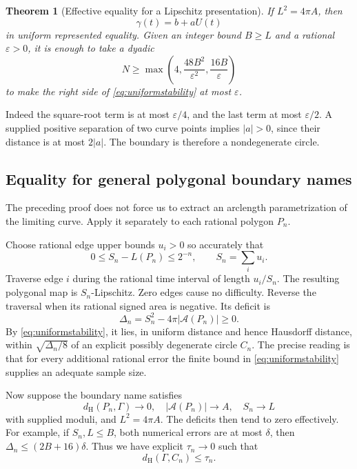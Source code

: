 \documentclass[11pt,a4paper]{article}
\newtheorem{theorem}{Theorem}[section]
\theoremstyle{definition}
\newcommand{\eps}{\varepsilon}
\newcommand{\Area}{\mathcal A}
\newcommand{\dH}{d_{\mathrm H}}
\begin{document}
\begin{theorem}[Effective equality for a Lipschitz presentation]
\label{thm:equalitylip}
If \(L^2=4\pi A\), then
\[
 \gamma(t)=b+aU(t)
\]
in uniform represented equality. Given an integer bound \(B\ge L\)
and a rational \(\eps>0\), it is enough to take a dyadic
\[
 N\ge\max\left(4,\frac{48B^2}{\eps^2},\frac{16B}{\eps}\right)
 \tag{10.12}\label{eq:rigiditymodulus}
\]
to make the right side of \eqref{eq:uniformstability} at most \(\eps\).
\end{theorem}

Indeed the square-root term is at most \(\eps/4\), and the last
term at most \(\eps/2\). A supplied positive separation of two curve
points implies \(|a|>0\), since their distance is at most \(2|a|\).
The boundary is therefore a nondegenerate circle.

\subsection{Equality for general polygonal boundary names}
\label{sec:shape}
The preceding proof does not force us to extract an arclength
parametrization of the limiting curve. Apply it separately to each
rational polygon \(P_n\).

Choose rational edge upper bounds \(u_i>0\) so accurately that
\[
 0\le S_n-L(P_n)\le2^{-n},\qquad S_n=\sum_i u_i.
\]
Traverse edge \(i\) during the rational time interval of length
\(u_i/S_n\). The resulting polygonal map is \(S_n\)-Lipschitz.
Zero edges cause no difficulty. Reverse the traversal when its rational
signed area is negative. Its deficit is
\[
 \Delta_n=S_n^2-4\pi|\Area(P_n)|\ge0.
\]
By \eqref{eq:uniformstability}, it lies, in uniform distance and hence
Hausdorff distance, within \(\sqrt{\Delta_n/8}\) of an explicit
possibly degenerate circle \(C_n\). The precise reading is that for
every additional rational error the finite bound in
\eqref{eq:uniformstability} supplies an adequate sample size.

Now suppose the boundary name satisfies
\[
 \dH(P_n,\Gamma)\to0,\quad
 |\Area(P_n)|\to A,\quad S_n\to L
\]
with supplied moduli, and \(L^2=4\pi A\).
The deficits then tend to zero effectively. For example, if
\(S_n,L\le B\), both numerical errors are at most \(\delta\), then
\(\Delta_n\le(2B+16)\delta\).
Thus we have explicit \(\tau_n\to0\) such that
\[
 \dH(\Gamma,C_n)\le\tau_n.
 \tag{10.13}\label{eq:circlehausdorff}
\]
\end{document}
